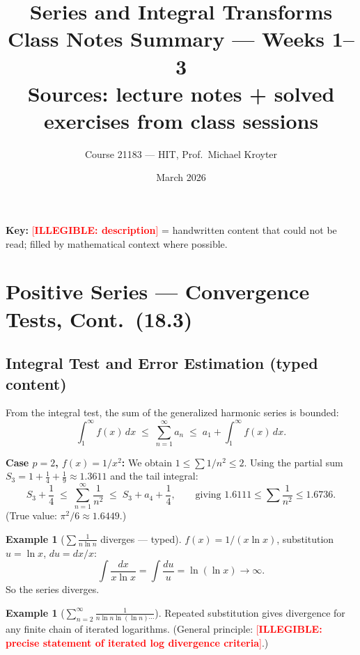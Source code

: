 \documentclass[12pt, a4paper]{article}
\title{\textbf{Series and Integral Transforms}\\[0.5em]
\large Class Notes Summary --- Weeks 1--3\\[0.3em]
\normalsize Sources: lecture notes + solved exercises from class sessions}
\author{Course 21183 --- HIT, Prof.\ Michael Kroyter}
\date{March 2026}
\newcommand{\illegible}[1][?]{\textcolor{red}{[\textbf{ILLEGIBLE: #1}]}}
\theoremstyle{definition}
\newtheorem{example}[theorem]{Example}
\theoremstyle{remark}
\begin{document}
\maketitle

\begin{mdframed}
\textbf{Key:} \illegible[description] = handwritten content that could not be read;
filled by mathematical context where possible.
\end{mdframed}

\tableofcontents
\newpage

\section{Positive Series --- Convergence Tests, Cont.\ (18.3)}

\subsection{Integral Test and Error Estimation (typed content)}

From the integral test, the sum of the generalized harmonic series is bounded:
\[
  \int_1^\infty f(x)\,dx \;\leq\; \sum_{n=1}^\infty a_n \;\leq\; a_1 + \int_1^\infty f(x)\,dx.
\]

\textbf{Case $p=2$, $f(x)=1/x^2$:} We obtain $1 \leq \sum 1/n^2 \leq 2$.
Using the partial sum $S_3 = 1 + \tfrac{1}{4} + \tfrac{1}{9} \approx 1.3611$ and the tail integral:
\[
  S_3 + \frac{1}{4} \;\leq\; \sum_{n=1}^\infty \frac{1}{n^2} \;\leq\; S_3 + a_4 + \frac{1}{4},
  \qquad \text{giving } 1.6111 \leq \sum \frac{1}{n^2} \leq 1.6736.
\]
(True value: $\pi^2/6 \approx 1.6449$.)

\begin{example}[$\sum \frac{1}{n \ln n}$ diverges --- typed]
$f(x) = 1/(x\ln x)$, substitution $u = \ln x$, $du = dx/x$:
\[
  \int \frac{dx}{x\ln x} = \int \frac{du}{u} = \ln(\ln x) \to \infty.
\]
So the series diverges.
\end{example}

\begin{example}[$\sum_{n=2}^\infty \frac{1}{n \ln n \ln(\ln n) \cdots}$]
Repeated substitution gives divergence for any finite chain of iterated logarithms.
(General principle: \illegible[precise statement of iterated log divergence criteria].)
\end{example}
\end{document}
